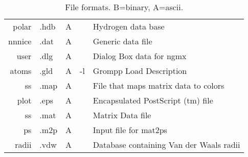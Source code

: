 \begin{table}
\begin{tabularx}{\linewidth}{rlccX}
   polar &  .hdb &   A &       & Hydrogen data base \\
  nnnice &  .dat &   A &       & Generic data file \\
    user &  .dlg &   A &       & Dialog Box data for ngmx \\
   atoms &  .gld &   A &    -l & Grompp Load Description \\
      ss &  .map &   A &       & File that maps matrix data to colors \\
    plot &  .eps &   A &       & Encapsulated PostScript (tm) file \\
      ss &  .mat &   A &       & Matrix Data file \\
      ps &  .m2p &   A &       & Input file for mat2ps \\
   radii &  .vdw &   A &       & Database containing Van der Waals radii \\
\hline
\end{tabularx}
\caption{File formats. B=binary, A=ascii.}
\label{Tab:form}
\end{table}

